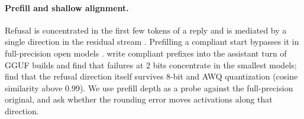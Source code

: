 \paragraph{Prefill and shallow alignment.}
Refusal is concentrated in the first few tokens of a reply \citep{qi2024shallow} and is mediated by a single direction in the residual stream \citep{arditi2024refusal}. Prefilling a compliant start bypasses it in full-precision open models \citep{qi2024shallow, struppek2026prefill}. \citet{park2026quantization} write compliant prefixes into the assistant turn of GGUF builds and find that failures at 2 bits concentrate in the smallest models; \citet{chhabra2025towards} find that the refusal direction itself survives 8-bit and AWQ quantization (cosine similarity above 0.99). We use prefill depth as a probe against the full-precision original, and ask whether the rounding error moves activations along that direction.
